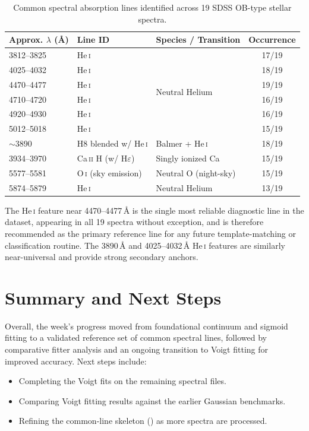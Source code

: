 \documentclass[12pt]{article}
\begin{document}
\begin{table}[htbp]
\centering
\caption{Common spectral absorption lines identified across 19 SDSS OB-type stellar spectra.}
\label{tab:common-lines}
\renewcommand{\arraystretch}{1.0}
\setlength{\tabcolsep}{4pt}
\begin{tabular}{@{}p{} p{} p{} c@{}}
\toprule
\textbf{Approx. $\lambda$ (\AA)} & \textbf{Line ID} & \textbf{Species / Transition} & \textbf{Occurrence} \\
\midrule
3812--3825 & He\,\textsc{i} & \multirow{6}{0.32\textwidth}{Neutral Helium} & 17/19 \\
4025--4032 & He\,\textsc{i} & & 18/19 \\
4470--4477 & He\,\textsc{i} & & 19/19 \\
4710--4720 & He\,\textsc{i} & & 16/19 \\
4920--4930 & He\,\textsc{i} & & 16/19 \\
5012--5018 & He\,\textsc{i} & & 15/19 \\
\midrule
$\sim$3890 & H8 blended w/ He\,\textsc{i} & Balmer + He\,\textsc{i} & 18/19 \\
3934--3970 & Ca\,\textsc{ii} H (w/ H$\varepsilon$) & Singly ionized Ca & 15/19 \\
5577--5581 & O\,\textsc{i} (sky emission) & Neutral O (night-sky) & 15/19 \\
5874--5879 & He\,\textsc{i} & Neutral Helium & 13/19 \\
\bottomrule
\end{tabular}
\end{table}


 
The He\,\textsc{i} feature near 4470--4477\,\r{A} is the single most reliable diagnostic line in the dataset, appearing in all 19 spectra without exception, and is therefore recommended as the primary reference line for any future template-matching or classification routine. The 3890\,\r{A} and 4025--4032\,\r{A} He\,\textsc{i} features are similarly near-universal and provide strong secondary anchors.
 

\section{Summary and Next Steps}
\label{sec:summary}
 
Overall, the week's progress moved from foundational continuum and sigmoid fitting to a validated reference set of common spectral lines, followed by comparative fitter analysis and an ongoing transition to Voigt fitting for improved accuracy. Next steps include:
 
\begin{itemize}[leftmargin=*]
  \item Completing the Voigt fits on the remaining spectral files.
  \item Comparing Voigt fitting results against the earlier Gaussian benchmarks.
  \item Refining the common-line skeleton () as more spectra are processed.
\end{itemize}
\end{document}
